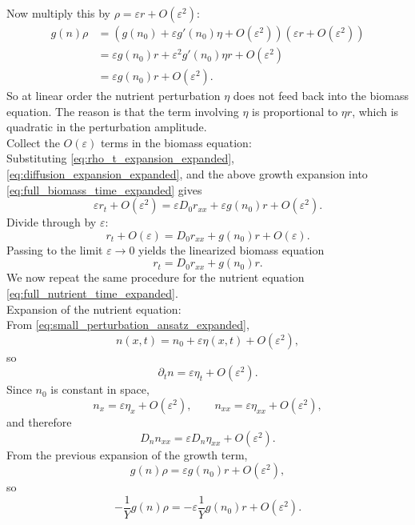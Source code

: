 \documentclass[11pt,a4paper]{report}
\begin{document}
	Now multiply this by $\rho=\varepsilon r+O(\varepsilon^2)$:
	\begin{align}
		g(n)\rho
		&=
		\left(g(n_0)+\varepsilon g'(n_0)\eta+O(\varepsilon^2)\right)
		\left(\varepsilon r+O(\varepsilon^2)\right)
		\\
		&=
		\varepsilon g(n_0)r
		+
		\varepsilon^2 g'(n_0)\eta r
		+
		O(\varepsilon^2)
		\\
		&=
		\varepsilon g(n_0)r+O(\varepsilon^2).
	\end{align}
	So at linear order the nutrient perturbation $\eta$ does not feed back into the biomass equation.  The reason is that the term involving $\eta$ is proportional to $\eta r$, which is quadratic in the perturbation amplitude.\\
	Collect the $O(\varepsilon)$ terms in the biomass equation:\\
	Substituting \eqref{eq:rho_t_expansion_expanded}, \eqref{eq:diffusion_expansion_expanded}, and the above growth expansion into \eqref{eq:full_biomass_time_expanded} gives
	\[
	\varepsilon r_t+O(\varepsilon^2)
	=
	\varepsilon D_0 r_{xx}
	+
	\varepsilon g(n_0)r
	+
	O(\varepsilon^2).
	\]
	Divide through by $\varepsilon$:
	\[
	r_t+O(\varepsilon)
	=
	D_0 r_{xx}+g(n_0)r+O(\varepsilon).
	\]
	Passing to the limit $\varepsilon\to 0$ yields the linearized biomass equation
	\begin{equation}
		r_t=D_0 r_{xx}+g(n_0)r.
		\label{eq:linearized_biomass_time_expanded}
	\end{equation}
	We now repeat the same procedure for the nutrient equation \eqref{eq:full_nutrient_time_expanded}.\\
	Expansion of the nutrient equation:\\
	From \eqref{eq:small_perturbation_ansatz_expanded},
	\[
	n(x,t)=n_0+\varepsilon \eta(x,t)+O(\varepsilon^2),
	\]
	so
	\begin{equation}
		\partial_t n
		=
		\varepsilon \eta_t+O(\varepsilon^2).
		\label{eq:n_t_expansion_expanded}
	\end{equation}
	Since $n_0$ is constant in space,
	\[
	n_x
	=
	\varepsilon \eta_x+O(\varepsilon^2),
	\qquad
	n_{xx}
	=
	\varepsilon \eta_{xx}+O(\varepsilon^2),
	\]
	and therefore
	\begin{equation}
		D_n n_{xx}
		=
		\varepsilon D_n \eta_{xx}+O(\varepsilon^2).
		\label{eq:n_diffusion_expansion_expanded}
	\end{equation}
	From the previous expansion of the growth term,
	\[
	g(n)\rho=\varepsilon g(n_0)r+O(\varepsilon^2),
	\]
	so
	\begin{equation}
		-\frac{1}{Y}g(n)\rho
		=
		-\varepsilon \frac{1}{Y}g(n_0)r+O(\varepsilon^2).
		\label{eq:n_sink_expansion_expanded}
	\end{equation}
\end{document}
